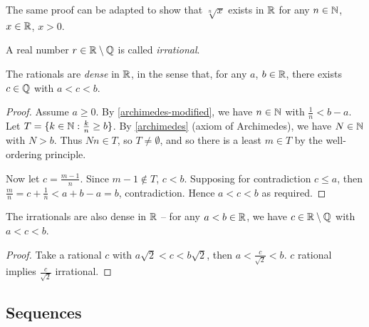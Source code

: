 \documentclass{../template/note}
\begin{document}
    \begin{remark*}
        The same proof can be adapted to show that \(\sqrt[n]{x}\) exists in \(\mathbb R\) for any \(n \in \mathbb N\), \(x \in \mathbb R\), \(x > 0\).
    \end{remark*}
    
    \begin{definition}
        A real number \(r \in \mathbb R \setminus \mathbb Q\) is called \emph{irrational}.
    \end{definition}

    
    

    \begin{proposition}
        The rationals are \emph{dense} in \(\mathbb R\), in the sense that, for any \(a\), \(b \in \mathbb R\), there exists \(c \in \mathbb Q\) with \(a < c < b\). 
    \end{proposition}
    
    \begin{proof}
        Assume \(a \geq 0\). By \cref{archimedes-modified}, we have \(n \in \mathbb N\) with \(\frac{1}{n} < b-a\). Let \(T = \{k \in \mathbb N: \frac{k}{n} \geq b\}\). By \cref{archimedes} (axiom of Archimedes), we have \(N \in \mathbb N\) with \(N > b\). Thus \(Nn \in T\), so \(T \neq \emptyset\), and so there is a least \(m \in T\) by the well-ordering principle.

        Now let \(c = \frac{m-1}{n}\). Since \(m-1 \notin T\), \(c < b\). Supposing for contradiction \(c \leq a\), then \(\frac{m}{n} = c + \frac 1 n < a + b - a = b\), contradiction. Hence \(a < c < b\) as required.
    \end{proof}
    
    \begin{proposition}
        The irrationals are also dense in \(\mathbb R\) -- for any \(a < b \in \mathbb R\), we have \(c \in \mathbb R \setminus \mathbb Q\) with \(a < c < b\).
    \end{proposition}
    
    \begin{proof}
        Take a rational \(c\) with \(a\sqrt{2} < c < b\sqrt{2}\), then \(a < \frac{c}{\sqrt 2} < b\). \(c\) rational implies \(\frac{c}{\sqrt 2}\) irrational.
    \end{proof}
    
    \subsection{Sequences}
\end{document}
